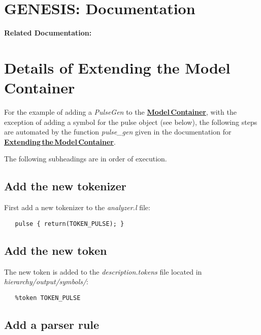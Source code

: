\documentclass[12pt]{article}
\begin{document}
\section*{GENESIS: Documentation}

{\bf Related Documentation:}

\section*{Details of Extending the Model\,Container}

For the example of adding a {\it PulseGen} to the \href{../model-container/model-container.tex}{\bf Model\,Container}, with the exception of adding a symbol for the pulse object (see below), the following steps are automated by the function {\it pulse\_gen} given in the documentation for \href{../genesis-extend-model-container/genesis-extend-model-container.tex}{\bf Extending\,the\,Model\,Container}.

The following subheadings are in order of execution.

\subsection*{Add the new tokenizer}

First add a new tokenizer to the {\it analyzer.l} file:
\begin{verbatim}
   pulse { return(TOKEN_PULSE); }
\end{verbatim}

\subsection*{Add the new token}

The new token is added to the {\it description.tokens} file located in {\it hierarchy/output/symbols/}:
\begin{verbatim}
   %token TOKEN_PULSE
\end{verbatim}

\subsection*{Add a parser rule}
\end{document}
